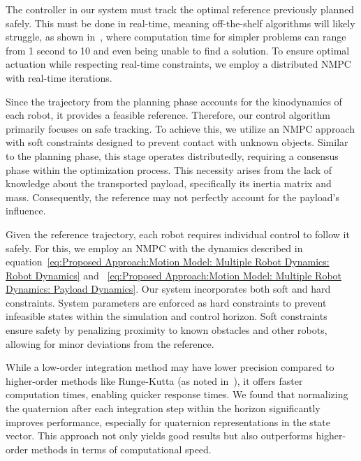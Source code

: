 The controller in our system must track the optimal reference previously planned safely. This must be done in real-time, meaning off-the-shelf algorithms will likely struggle, as shown in~\cite{7400956}, where computation time for simpler problems can range from 1 second to 10 and even being unable to find a solution. To ensure optimal actuation while respecting real-time constraints, we employ a distributed NMPC with real-time iterations.

Since the trajectory from the planning phase accounts for the kinodynamics of each robot, it provides a feasible reference. Therefore, our control algorithm primarily focuses on safe tracking. To achieve this, we utilize an NMPC approach with soft constraints designed to prevent contact with unknown objects. Similar to the planning phase, this stage operates distributedly, requiring a consensus phase within the optimization process. This necessity arises from the lack of knowledge about the transported payload, specifically its inertia matrix and mass. Consequently, the reference may not perfectly account for the payload's influence.

Given the reference trajectory, each robot requires individual control to follow it safely. For this, we employ an NMPC with the dynamics described in equation~\ref{eq:Proposed Approach:Motion Model: Multiple Robot Dynamics: Robot Dynamics} and ~\ref{eq:Proposed Approach:Motion Model: Multiple Robot Dynamics: Payload Dynamics}. Our system incorporates both soft and hard constraints. System parameters are enforced as hard constraints to prevent infeasible states within the simulation and control horizon. Soft constraints ensure safety by penalizing proximity to known obstacles and other robots, allowing for minor deviations from the reference.


While a low-order integration method may have lower precision compared to higher-order methods like Runge-Kutta (as noted in~\cite{gros2020linear}), it offers faster computation times, enabling quicker response times. We found that normalizing the quaternion after each integration step within the horizon significantly improves performance, especially for quaternion representations in the state vector. This approach not only yields good results but also outperforms higher-order methods in terms of computational speed.